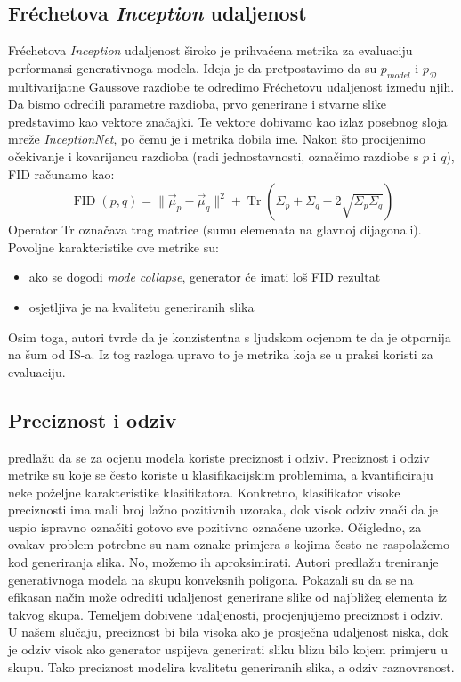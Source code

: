 \subsection{Fréchetova \textit{Inception} udaljenost}
Fréchetova \textit{Inception} udaljenost \citep{heusel2017gans}  široko je prihvaćena metrika za evaluaciju performansi generativnoga modela. Ideja je da pretpostavimo da su $p_{model}$ i $p_{\mathcal{D}}$ multivarijatne Gaussove razdiobe te odredimo Fréchetovu udaljenost između njih. Da bismo odredili parametre razdioba, prvo generirane i stvarne slike predstavimo kao vektore značajki. Te vektore dobivamo kao izlaz posebnog sloja mreže \textit{InceptionNet}, po čemu je i metrika dobila ime. Nakon što procijenimo očekivanje i kovarijancu razdioba (radi jednostavnosti, označimo razdiobe s $p$ i $q$), FID računamo kao:
\begin{equation}
\operatorname*{FID}(p, q) = \|\vec{\mu}_p - \vec{\mu}_q\|^2 + \operatorname*{Tr}(\Sigma_p + \Sigma_q - 2\sqrt{\Sigma_p\Sigma_q})
\end{equation}
Operator Tr označava trag matrice (sumu elemenata na glavnoj dijagonali).
Povoljne karakteristike ove metrike su:
\begin{itemize}
	\item ako se dogodi \textit{mode collapse}, generator će imati loš FID rezultat
	\item osjetljiva je na kvalitetu generiranih slika
\end{itemize}
Osim toga, autori tvrde da je konzistentna s ljudskom ocjenom te da je otpornija na šum od IS-a. Iz tog razloga upravo to je metrika koja se u praksi koristi za evaluaciju.

\subsection{Preciznost i odziv}
\citep{lucic2017gans} predlažu da se za ocjenu modela koriste preciznost i odziv. Preciznost i odziv metrike su koje se često koriste u klasifikacijskim problemima, a kvantificiraju neke poželjne karakteristike klasifikatora. Konkretno, klasifikator visoke preciznosti ima mali broj lažno pozitivnih uzoraka, dok visok odziv znači da je uspio ispravno označiti gotovo sve pozitivno označene uzorke. Očigledno, za ovakav problem potrebne su nam oznake primjera s kojima često ne raspolažemo kod generiranja slika. No, možemo ih aproksimirati.
Autori predlažu treniranje generativnoga modela na skupu konveksnih poligona. Pokazali su da se na efikasan način može odrediti udaljenost generirane slike od najbližeg elementa iz takvog skupa. Temeljem dobivene udaljenosti, procjenjujemo preciznost i odziv. U našem slučaju, preciznost bi bila visoka ako je prosječna udaljenost niska, dok je odziv visok ako generator uspijeva generirati sliku blizu bilo kojem primjeru u skupu. Tako preciznost modelira kvalitetu generiranih slika, a odziv raznovrsnost.   
   
